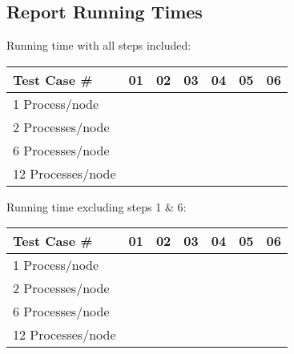 \documentclass{article}
\begin{document}
\subsection{Report Running Times}

Running time with all steps included:

\begin{center}
  \begin{tabular}{| l | r | r | r | r | r | r |}
    \hline
    Test Case \# & 01 & 02 & 03 & 04 & 05 & 06  \\ \hline
    1 Process/node &  &  &  &  &  &  \\ \hline
    2 Processes/node &  &  &  &  &  &  \\ \hline
    6 Processes/node &  &  &  &  &  &  \\ \hline
    12 Processes/node &  &  &  &  &  &  \\ \hline
  \end{tabular}
\end{center}


Running time excluding steps 1 \& 6:

\begin{center}
  \begin{tabular}{| l | r | r | r | r | r | r |}
    \hline
    Test Case \# & 01 & 02 & 03 & 04 & 05 & 06  \\ \hline
    1 Process/node &  &  &  &  &  &  \\ \hline
    2 Processes/node &  &  &  &  &  &  \\ \hline
    6 Processes/node &  &  &  &  &  &  \\ \hline
    12 Processes/node &  &  &  &  &  &  \\ \hline
  \end{tabular}
\end{center}
\end{document}
